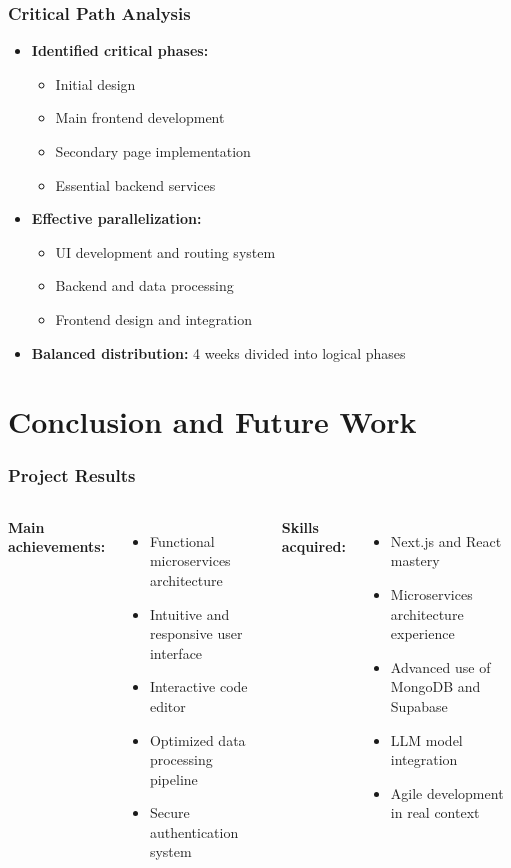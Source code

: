 \documentclass{beamer}
\begin{document}
\begin{frame}
\frametitle{Critical Path Analysis}
\begin{itemize}
    \item \textbf{Identified critical phases:}
    \begin{itemize}
        \item Initial design
        \item Main frontend development
        \item Secondary page implementation
        \item Essential backend services
    \end{itemize}
    \item \textbf{Effective parallelization:}
    \begin{itemize}
        \item UI development and routing system
        \item Backend and data processing
        \item Frontend design and integration
    \end{itemize}
    \item \textbf{Balanced distribution:} 4 weeks divided into logical phases
\end{itemize}
\end{frame}

\section{Conclusion and Future Work}

\begin{frame}
\frametitle{Project Results}
\begin{columns}
\textbf{Main achievements:}
\begin{itemize}
    \item Functional microservices architecture
    \item Intuitive and responsive user interface
    \item Interactive code editor
    \item Optimized data processing pipeline
    \item Secure authentication system
\end{itemize}

\textbf{Skills acquired:}
\begin{itemize}
    \item Next.js and React mastery
    \item Microservices architecture experience
    \item Advanced use of MongoDB and Supabase
    \item LLM model integration
    \item Agile development in real context
\end{itemize}
\end{columns}
\end{frame}
\end{document}
